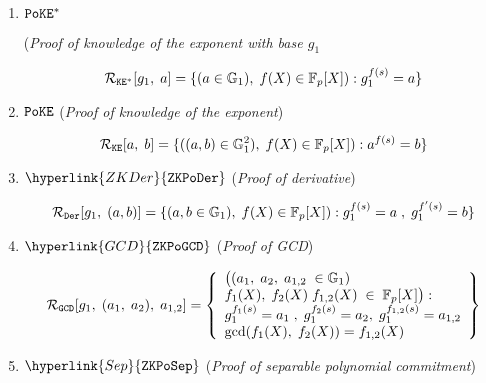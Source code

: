 \documentclass[11pt, lettersize, notitlepage, leqno, footskip=0.6cm]{article}
\newcommand{\bFp}{\mathbb{F}_p}
\newcommand{\mc}{\mathcal}
\newcommand{\mb}{\mathbb}
\newcommand{\vs}{\vspace{-0.15cm}}
\numberwithin{equation}{section}
\begin{document}
\footnotesize

\begin{enumerate}[wide, labelwidth=!, labelindent=0pt, itemsep=-0.2ex] 
 

\item \hypertarget{Protocol List}{$\tt{PoKE}^*$} (\textit{Proof of knowledge of the exponent with base $g_1$} \vspace{-0.3cm}

$$\mc{R}_{\tt{KE}^*}[g_1,\;a] = \{(a\in\mb{G}_1),\; f(X)\in \bFp[X]): g_1^{f(s)} = a \} \vs $$

    

\item $\tt{PoKE}$ (\textit{Proof of knowledge of the exponent}) \vspace{-0.3cm}

$$\mc{R}_{\tt{KE}}[a,\;b] = \{((a,b)\in\mb{G}_1^2),\; f(X)\in \bFp[X]): a^{f(s)} = b \} \vs $$


\item $\hyperlink{ZKDer}{\tt{ZKPoDer}}$ (\textit{Proof of derivative}) \vspace{-0.3cm}

$$\mc{R}_{\tt{Der}}[g_1,\;(a,b)] = \{(a,b\in\mb{G}_1),\; f(X)\in \bFp[X]): g_1^{f(s)} = a\;,\; g_1^{f'(s)} = b \} \vs $$



\item $\hyperlink{GCD}{\tt{ZKPoGCD}}$ (\textit{Proof of GCD}) \vspace{-0.4cm}

$$\mc{R}_{\tt{GCD}}[g_1,\;(a_1,\;a_2),\;a_{1,2}] = \left\{\begin{array}{l}\big((a_1,\;a_2,\;a_{1,2}\;\in\mb{G}_1)\\ 
f_1(X),\;f_2(X)\;f_{1,2}(X)\;\in\; \bFp[X]\big):\\ g_1^{f_1(s)} = a_1\;,\; g_1^{f_2(s)} = a_2 ,\; g_1^{f_{1,2}(s)} = a_{1,2}\\ 
\gcd(f_1(X),\;f_2(X))=f_{1,2}(X) \end{array}\right\} $$



\item $\hyperlink{Sep}{\tt{ZKPoSep}}$ (\textit{Proof of separable polynomial commitment})  \vspace{-0.4cm}


\end{enumerate}
\end{document}
